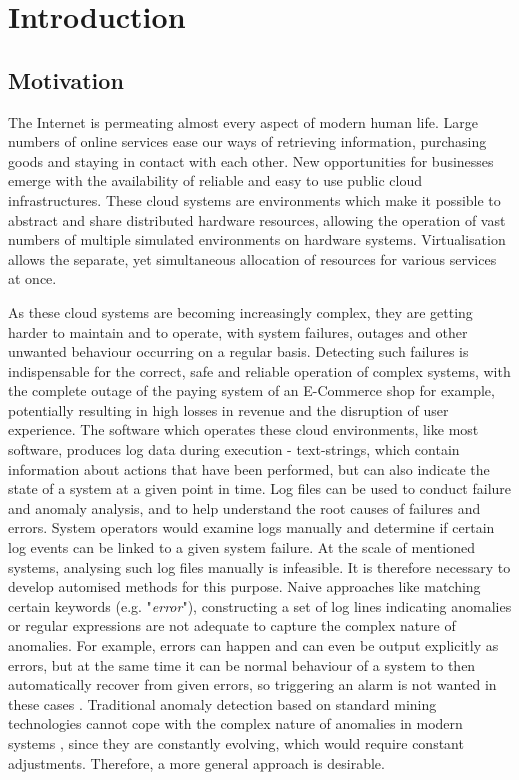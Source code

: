 \chapter{Introduction\label{cha:introduction}}


\section{Motivation\label{sec:motivation}}
The Internet is permeating almost every aspect of modern human life. Large numbers of online services ease our ways of retrieving information, purchasing goods and staying in contact with each other. New opportunities for businesses emerge with the availability of reliable and easy to use public cloud infrastructures. These cloud systems are environments which make it possible to abstract and share distributed hardware resources, allowing the operation of vast numbers of multiple simulated environments on hardware systems. Virtualisation allows the separate, yet simultaneous allocation of resources for various services at once.

As these cloud systems are becoming increasingly complex, they are getting harder to maintain and to operate, with system failures, outages and other unwanted behaviour occurring on a regular basis. Detecting such failures is indispensable for the correct, safe and reliable operation of complex systems, with the complete outage of the paying system of an E-Commerce shop for example, potentially resulting in high losses in revenue and the disruption of user experience. The software which operates these cloud environments, like most software, produces log data during execution - text-strings, which contain information about actions that have been performed, but can also indicate the state of a system at a given point in time. Log files can be used to conduct failure and anomaly analysis, and to help understand the root causes of failures and errors. System operators would examine logs manually and determine if certain log events can be linked to a given system failure. At the scale of mentioned systems, analysing such log files manually is infeasible. It is therefore necessary to develop automised methods for this purpose. Naive approaches like matching certain keywords (e.g. "\textit{error}"), constructing a set of log lines indicating anomalies or regular expressions are not adequate to capture the complex nature of anomalies. For example, errors can happen and can even be output explicitly as errors, but at the same time it can be normal behaviour of a system to then automatically recover from given errors, so triggering an alarm is not wanted in these cases \cite{meng2019loganomaly}. Traditional anomaly detection based on standard mining technologies cannot cope with the complex nature of anomalies in modern systems \cite{du2017deeplog}, since they are constantly evolving, which would require constant adjustments. Therefore, a more general approach is desirable.





